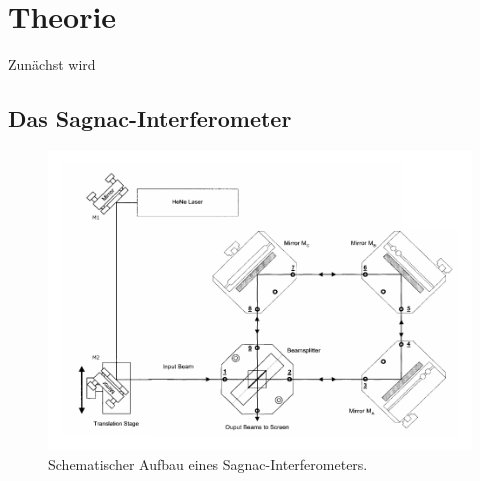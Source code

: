 \section{Theorie}
\label{sec:Theorie}

Zunächst wird 

\subsection{Das Sagnac-Interferometer}

\begin{figure}
    \centering
    \includegraphics[width = 0.5 \linewidth]{pictures/aufbau1.pdf}
    \caption{Schematischer Aufbau eines Sagnac-Interferometers.\cite{v64}}
    \label{aufbau1}
\end{figure}